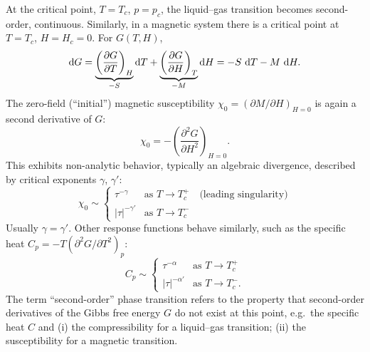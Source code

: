At the critical point, $T = T_c$, $p = p_c$, the liquid--gas transition becomes
second-order, continuous. Similarly, in a magnetic system there is a critical point
at $T = T_c$, $H = H_c = 0$. For $G(T,H)$,
\begin{equation}
  \mathop{}\!\mathrm{d} G = \underbrace{\left(\frac{\partial G}{\partial T}\right)_H}_{-S}\mathop{}\!\mathrm{d} T
        + \underbrace{\left(\frac{\partial G}{\partial H}\right)_T}_{-M}\mathop{}\!\mathrm{d} H
        = -S\,\mathop{}\!\mathrm{d} T - M\,\mathop{}\!\mathrm{d} H.
\end{equation}
The zero-field (``initial'') magnetic susceptibility
$\chi_0 = (\partial M/\partial H)_{H=0}$ is again a second derivative of $G$:
\begin{equation}
  \chi_0 = -\left(\frac{\partial^2 G}{\partial H^2}\right)_{H=0}.
\end{equation}
This exhibits non-analytic behavior, typically an algebraic divergence, described by
critical exponents $\gamma$, $\gamma'$:
\begin{equation}
  \chi_0\sim
  \begin{cases}
    \tau^{-\gamma} & \text{as } T\to T_c^+\quad\text{(leading singularity)}\\
    |\tau|^{-\gamma'} & \text{as } T\to T_c^-
  \end{cases}
\end{equation}
Usually $\gamma = \gamma'$. Other response functions behave similarly, such as the
specific heat $C_p = -T(\partial^2 G/\partial T^2)_p$:
\begin{equation}
  C_p\sim
  \begin{cases}
    \tau^{-\alpha} & \text{as } T\to T_c^+\\
    |\tau|^{-\alpha'} & \text{as } T\to T_c^-.
  \end{cases}
\end{equation}
The term ``second-order'' phase transition refers to the property that second-order
derivatives of the Gibbs free energy $G$ do not exist at this point, e.g.\ the
specific heat $C$ and (i) the compressibility for a liquid--gas transition; (ii) the
susceptibility for a magnetic transition.

\begin{diagram}
\end{diagram}

